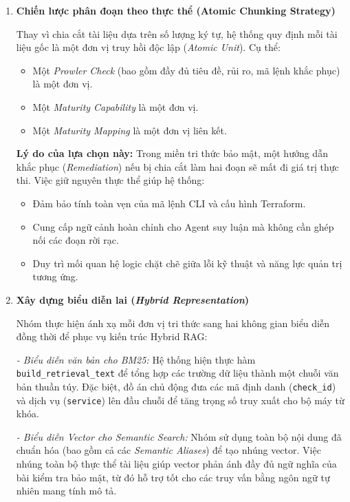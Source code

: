\begin{enumerate}
    \item \textbf{Chiến lược phân đoạn theo thực thể (Atomic Chunking Strategy)}

    Thay vì chia cắt tài liệu dựa trên số lượng ký tự, hệ thống quy định mỗi tài liệu gốc là một đơn vị truy hồi độc lập (\textit{Atomic Unit}). Cụ thể:
    \begin{itemize}
        \item Một \textit{Prowler Check} (bao gồm đầy đủ tiêu đề, rủi ro, mã lệnh khắc phục) là một đơn vị.
        \item Một \textit{Maturity Capability} là một đơn vị.
        \item Một \textit{Maturity Mapping} là một đơn vị liên kết.
    \end{itemize}

    \textbf{Lý do của lựa chọn này:} Trong miền tri thức bảo mật, một hướng dẫn khắc phục (\textit{Remediation}) nếu bị chia cắt làm hai đoạn sẽ mất đi giá trị thực thi. Việc giữ nguyên thực thể giúp hệ thống:
    \begin{itemize}
        \item Đảm bảo tính toàn vẹn của mã lệnh CLI và cấu hình Terraform.
        \item Cung cấp ngữ cảnh hoàn chỉnh cho Agent suy luận mà không cần ghép nối các đoạn rời rạc.
        \item Duy trì mối quan hệ logic chặt chẽ giữa lỗi kỹ thuật và năng lực quản trị tương ứng.
    \end{itemize}

    \item \textbf{Xây dựng biểu diễn lai (\textit{Hybrid Representation})}

    Nhóm thực hiện ánh xạ mỗi đơn vị tri thức sang hai không gian biểu diễn đồng thời để phục vụ kiến trúc Hybrid RAG:

    \textit{- Biểu diễn văn bản cho BM25:} Hệ thống hiện thực hàm \texttt{build\_retrieval\_text} để tổng hợp các trường dữ liệu thành một chuỗi văn bản thuần túy. Đặc biệt, đồ án chủ động đưa các mã định danh (\texttt{check\_id}) và dịch vụ (\texttt{service}) lên đầu chuỗi để tăng trọng số truy xuất cho bộ máy từ khóa.

    \textit{- Biểu diễn Vector cho Semantic Search:} Nhóm sử dụng toàn bộ nội dung đã chuẩn hóa (bao gồm cả các \textit{Semantic Aliases}) để tạo nhúng vector. Việc nhúng toàn bộ thực thể tài liệu giúp vector phản ánh đầy đủ ngữ nghĩa của bài kiểm tra bảo mật, từ đó hỗ trợ tốt cho các truy vấn bằng ngôn ngữ tự nhiên mang tính mô tả.


\end{enumerate}
